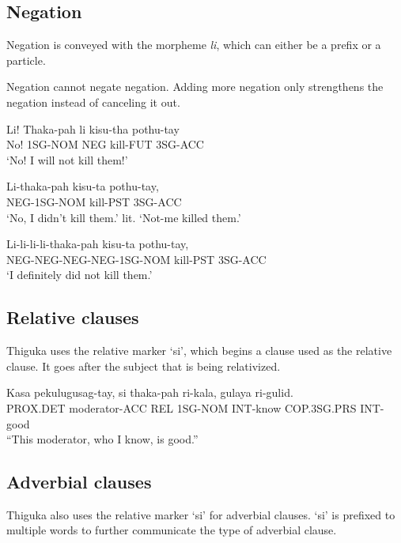 \subsection{Negation}
Negation is conveyed with the morpheme \emph{li}, which can either be a prefix or a particle.

Negation cannot negate negation.
Adding more negation only strengthens the negation instead of canceling it out.

\begin{exe}
    \ex{} \gll{}Li! Thaka-pah li kisu-tha pothu-tay\\
    No! 1SG-NOM NEG kill-FUT 3SG-ACC\\
    \glt{}`No! I will not kill them!'
\end{exe}

\begin{exe}
    \ex{} \gll{}Li-thaka-pah kisu-ta pothu-tay,\\
    NEG-1SG-NOM kill-PST 3SG-ACC\\
    \glt{}`No, I didn't kill them.'
    \glt{}lit. `Not-me killed them.'
\end{exe}

\begin{exe}
    \ex{} \gll{}Li-li-li-li-thaka-pah kisu-ta pothu-tay,\\
    NEG-NEG-NEG-NEG-1SG-NOM kill-PST 3SG-ACC\\
    \glt{}`I definitely did not kill them.'
\end{exe}

\subsection{Relative clauses}
Thiguka uses the relative marker `si', which begins a clause used as the relative clause.
It goes after the subject that is being relativized.

\begin{exe}
    \ex{} \gll{}Kasa     pekulugusag-tay, si  thaka-pah ri-kala, gulaya      ri-gulid.\\
                PROX.DET moderator-ACC    REL 1SG-NOM   INT-know COP.3SG.PRS INT-good \\
    \glt{}``This moderator, who I know, is good.''
\end{exe}

\subsection{Adverbial clauses}
Thiguka also uses the relative marker `si' for adverbial clauses. `si' is prefixed to
multiple words to further communicate the type of adverbial clause.


